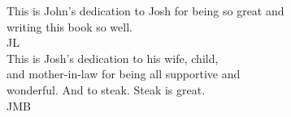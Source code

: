 \thispagestyle{empty}
\vspace*{\fill}
\begin{center}This is John's dedication to Josh for being so great and \\
writing this book so well.\\
JL\\
\vspace*{3pc}
This is Josh's dedication to his wife, child, \\
and mother-in-law for being all supportive and \\
wonderful.  And to steak.  Steak is great. \\[1ex]
JMB
\end{center}
\vspace*{\fill}
